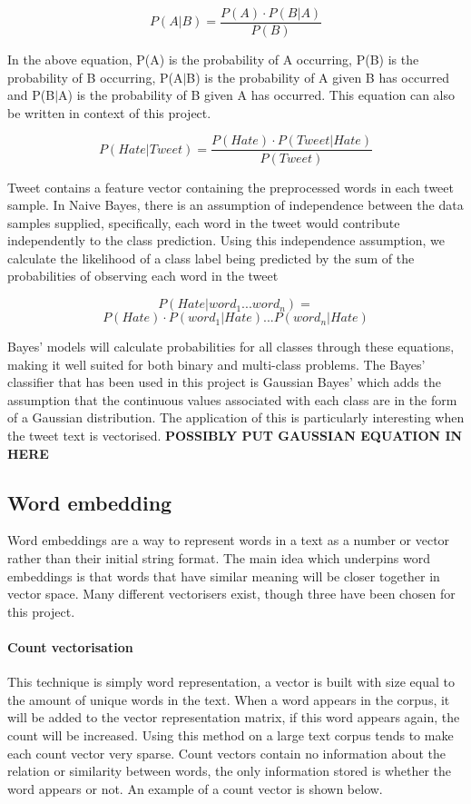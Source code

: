 \documentclass[conference]{IEEEtran}
\begin{document}
\[P(A|B) = \frac{P(A) \cdot P(B|A)}{P(B)}\]

In the above equation, P(A) is the probability of A occurring, P(B) is the probability of B occurring, P(A$|$B) is the probability of A given B has occurred and P(B$|$A) is the probability of B given A has occurred. This equation can also be written in context of this project.

\[P(Hate|Tweet) = \frac{P(Hate) \cdot P(Tweet|Hate)}{P(Tweet)}\]

Tweet contains a feature vector containing the preprocessed words in each tweet sample. In Naive Bayes, there is an assumption of independence between the data samples supplied, specifically, each word in the tweet would contribute independently to the class prediction. Using this independence assumption, we calculate the likelihood of a class label being predicted by the sum of the probabilities of observing each word in the tweet

\[P(Hate|word_1 ... word_n) = \] 
\[P(Hate) \cdot P(word_1|Hate)... P(word_n|Hate)\]

Bayes' models will calculate probabilities for all classes through these equations, making it well suited for both binary and multi-class problems.
The Bayes' classifier that has been used in this project is Gaussian Bayes' which adds the assumption that the continuous values associated with each class are in the form of a Gaussian distribution. The application of this is particularly interesting when the tweet text is vectorised.
\textbf{POSSIBLY PUT GAUSSIAN EQUATION IN HERE}

\subsection{Word embedding}
Word embeddings are a way to represent words in a text as a number or vector rather than their initial string format. The main idea which underpins word embeddings is that words that have similar meaning will be closer together in vector space. Many different vectorisers exist, though three have been chosen for this project.\\

\paragraph{\textbf{Count vectorisation}} This technique is simply word representation, a vector is built with size equal to the amount of unique words in the text. When a word appears in the corpus, it will be added to the vector representation matrix, if this word appears again, the count will be increased. Using this method on a large text corpus tends to make each count vector very sparse. Count vectors contain no information about the relation or similarity between words, the only information stored is whether the word appears or not. An example of a count vector is shown below.
\end{document}
